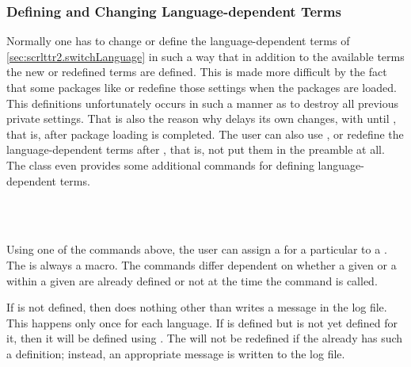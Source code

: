 \subsubsection{Defining and Changing Language-dependent Terms}
\label{sec:scrlttr2-experts.defLanguageTerms}
\begin{Explain}
  Normally one has to change or define the language-dependent terms of
  \autoref{sec:scrlttr2.switchLanguage} in such a way that in addition
  to the available terms the new or redefined terms are defined. This
  is made more difficult by the fact that some packages like
   or
   redefine those settings when
  the packages are loaded. This definitions unfortunately occurs in
  such a manner as to destroy all previous private settings. That is
  also the reason why  delays its own changes, with
   until ,
  that is, after package loading is completed. The user can also use
  , or redefine the language-dependent terms
  after , that is, not put them in
  the preamble at all. The class  even provides some
  additional commands for defining language-dependent terms.
\end{Explain}

\begin{Declaration}
    \\
    \\
\end{Declaration}
%
%
%
Using one of the commands above, the user can assign a
 for a particular  to a
.  The  is always a macro. The commands differ
dependent on whether a given  or a  within
a given  are already defined or not at the time the
command is called.

If  is not defined, then 
does nothing other than writes a message in the log file. This happens
only once for each language.  If  is defined but
 is not yet defined for it, then it will be defined using
.  The  will not be redefined if the
 already has such a definition; instead, an
appropriate message is written to the log file.

